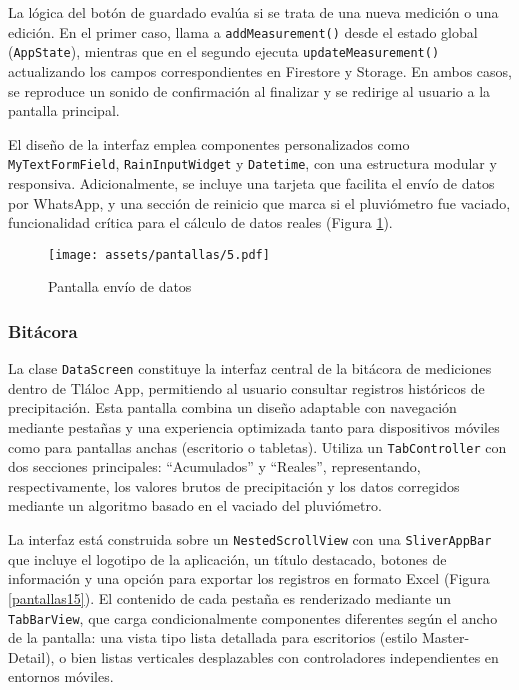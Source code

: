 La lógica del botón de guardado evalúa si se trata de una nueva medición o una edición. En el primer caso, llama a \texttt{addMeasurement()} desde el estado global (\texttt{AppState}), mientras que en el segundo ejecuta \texttt{updateMeasurement()} actualizando los campos correspondientes en Firestore y Storage. En ambos casos, se reproduce un sonido de confirmación al finalizar y se redirige al usuario a la pantalla principal.

El diseño de la interfaz emplea componentes personalizados como \texttt{MyTextFormField}, \texttt{RainInputWidget} y \texttt{Datetime}, con una estructura modular y responsiva. Adicionalmente, se incluye una tarjeta que facilita el envío de datos por WhatsApp, y una sección de reinicio que marca si el pluviómetro fue vaciado, funcionalidad crítica para el cálculo de datos reales (Figura \ref{pantallas5}).

\begin{figure}[h!]
\centering
  \texttt{[image: assets/pantallas/5.pdf]}
  \caption{Pantalla envío de datos}
  \label{pantallas5}
\end{figure}



\newpage
\subsubsection*{Bitácora}

La clase \texttt{DataScreen} %
constituye la interfaz central de la bitácora de mediciones dentro de Tláloc App, permitiendo al usuario consultar registros históricos de precipitación. Esta pantalla combina un diseño adaptable con navegación mediante pestañas y una experiencia optimizada tanto para dispositivos móviles como para pantallas anchas (escritorio o tabletas). Utiliza un \texttt{TabController} con dos secciones principales: ``Acumulados'' y ``Reales'', representando, respectivamente, los valores brutos de precipitación y los datos corregidos mediante un algoritmo basado en el vaciado del pluviómetro.

La interfaz está construida sobre un \texttt{NestedScrollView} con una \texttt{SliverAppBar} que incluye el logotipo de la aplicación, un título destacado, botones de información y una opción para exportar los registros en formato Excel (Figura \ref{pantallas15}). El contenido de cada pestaña es renderizado mediante un \texttt{TabBarView}, que carga condicionalmente componentes diferentes según el ancho de la pantalla: una vista tipo lista detallada para escritorios (estilo Master-Detail), o bien listas verticales desplazables con controladores independientes en entornos móviles.

